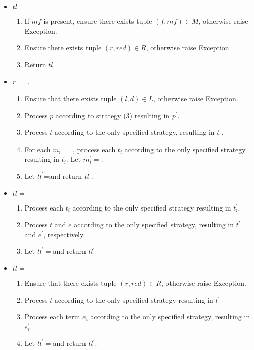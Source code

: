\begin{itemize}
\item $tl=$ \ReadFromStdinAndApplyReductionRelation
\begin{enumerate}
\item If $mf$ is present, ensure there exists tuple $(f, mf) \in M$, otherwise raise Exception.
\item Ensure there exists tuple $(r, red) \in R$, otherwise raise Exception.
\item Return $tl$.
\end{enumerate}


\item
$r=$ \RedexMatchAssertEqual.
	\begin{enumerate}
	\item Ensure that there exists tuple $(l, d) \in L$, otherwise raise Exception.
	\item Process $p$ according to strategy (3) resulting in $p^\prime$.
	\item Process $t$ according to the only specified strategy, resulting in $t^\prime$.
	\item For each $m_i=$ \Match, process each $t_i$ according to the only specified strategy resulting in $t_i^\prime$. Let $m_i^\prime=$\Match[$s_1$][$t_1^\prime$][$s_n$][$t_n^\prime$][false].
	\item Let $tl^\prime$=\RedexMatchAssertEqual[$l$][$p^\prime$][$t^\prime$][$m_1^\prime$][$m_n^\prime$][false] and return $tl^\prime$.
	\end{enumerate}

\item $tl=$ \TermLetAssertEqual
	\begin{enumerate}
	\item  Process each $t_i$ according to the only specified strategy resulting in $t_i^\prime$.
	\item Process $t$ and $e$ according to the only specified strategy, resulting in $t^\prime$ and $e^\prime$, respectively.
	\item Let $tl^\prime=$\TermLetAssertEqual[$v_1$][$n_1$][$t_1^\prime$][$v_m$][$n_m$][$t_m^\prime$][$t^\prime$][$e^\prime$][false] and return $tl^\prime$.
	\end{enumerate}

\item $tl=$ \ApplyReductionRelationAssertEqual
	\begin{enumerate}
	\item Ensure that there exists tuple $(r, red) \in R$, otherwise raise Exception.
	\item Process $t$ according to the only specified strategy resulting in $t^\prime$
	\item Process each term $e_i$ according to the only specified strategy, resulting in $e_i^\prime$.
	\item Let $tl^\prime=$\ApplyReductionRelationAssertEqual[$r$][$t^\prime$][$e_1^\prime$][$e_n^\prime$][false] and return $tl^\prime$.
	\end{enumerate}
\end{itemize}

